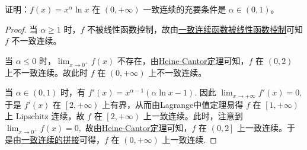 \documentclass[../../main.tex]{subfiles}%
\begin{document}
\begin{example}
证明：\( f(x) = x^{\alpha} \ln x \) 在 \( (0, +\infty) \) 一致连续的充要条件是 \( \alpha \in (0,1) \)。
\end{example}
\begin{proof}
当 $\alpha \geqslant 1$ 时，$f$ 不被线性函数控制，故由\hyperref[corollary:一致连续函数被线性函数控制1]{一致连续函数被线性函数控制}可知 $f$ 不一致连续。

当 $\alpha \leqslant 0$ 时，$\lim_{x \rightarrow 0^+} f\left( x \right)$ 不存在，由\hyperref[theroem:Heine-Cantor定理]{Heine-Cantor定理}可知，$f$ 在 $\left( 0,2 \right)$ 上不一致连续。故此时 $f$ 在 $\left( 0,+\infty \right)$ 上不一致连续。

当 $\alpha \in \left( 0,1 \right)$ 时，有
\(
f'\left( x \right) = x^{\alpha - 1} \left( \alpha \ln x - 1 \right).
\)
因此
\(
\lim_{x \rightarrow +\infty} f'\left( x \right) = 0,
\)
于是 $f'\left( x \right)$ 在 $\left[ 2,+\infty \right)$ 上有界，从而由Lagrange中值定理易得 $f$ 在 $\left[ 1,+\infty \right)$ 上 Lipschitz 连续，故 $f$ 在 $\left[ 2,+\infty \right)$ 上一致连续。此时，注意到
\(
\lim_{x \rightarrow 0^+} f\left( x \right) = 0,
\)
故由\hyperref[theroem:Heine-Cantor定理]{Heine-Cantor定理}可知，$f$ 在 $\left( 0,2 \right]$ 上一致连续。于是由\hyperref[proposition:一致连续函数的拼接]{一致连续的拼接}可得，$f$ 在 $\left( 0,+\infty \right)$ 上一致连续.
\end{proof}
\end{document}
